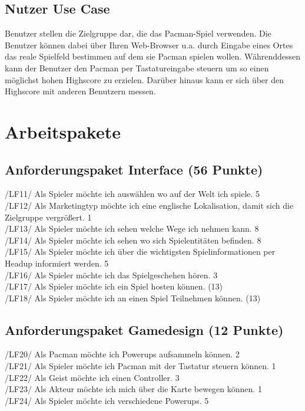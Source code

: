 \documentclass[11pt,a4paper]{article}
\begin{document}
\subsection{Nutzer Use Case}
Benutzer stellen die Zielgruppe dar, die das Pacman-Spiel verwenden.
Die Benutzer können dabei über Ihren Web-Browser u.a. durch Eingabe eines Ortes das reale Spielfeld bestimmen auf dem sie Pacman spielen wollen.
Währenddessen kann der Benutzer den Pacman per Tastatureingabe steuern um so einen möglichst hohen Highscore zu erzielen.
Darüber hinaus kann er sich über den Highscore mit anderen Benutzern messen.


\section{Arbeitspakete}
\subsection{Anforderungspaket Interface (56 Punkte)}

/LF11/ Als Spieler möchte ich auswählen wo
auf der Welt ich spiele. 5
\\
/LF12/ Als Marketingtyp möchte ich eine
englische Lokalisation, damit sich die
Zielgruppe vergrößert. 1\\
/LF13/ Als Spieler möchte ich sehen welche
Wege ich nehmen kann. 8\\
/LF14/ Als Spieler möchte ich sehen wo sich
Spielentitäten befinden. 8\\
/LF15/ Als Spieler möchte ich über die
wichtigsten Spielinformationen per Headup
informiert werden. 5\\
/LF16/ Als Spieler möchte ich das
Spielgeschehen hören. 3\\
/LF17/ Als Spieler möchte ich ein Spiel
hosten können. (13)\\
/LF18/ Als Spieler möchte ich an einen Spiel
Teilnehmen können. (13)\\

\subsection{Anforderungspaket Gamedesign (12 Punkte)}

/LF20/ Als Pacman möchte ich Powerups
aufsammeln können. 2\\
/LF21/ Als Spieler möchte ich Pacman mit der
Tastatur steuern können. 1\\
/LF22/ Als Geist möchte ich einen Controller. 3\\
/LF23/ Als Akteur möchte ich mich über die
Karte bewegen können. 1\\
/LF24/ Als Spieler möchte ich verschiedene
Powerups. 5\\
\end{document}
